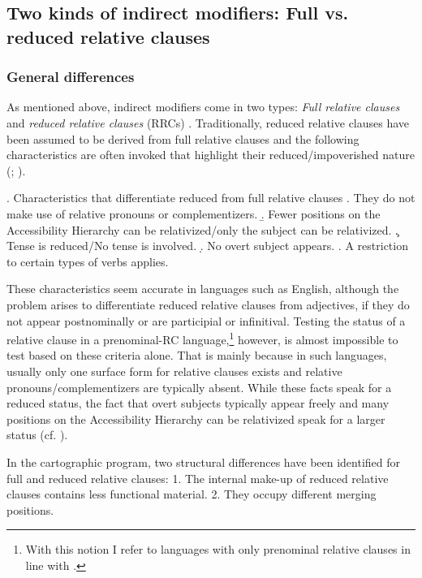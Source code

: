 \documentclass [output=book,colorlinks,citecolor=brown]{langscibook}
\begin{document}
\subsection{Two kinds of indirect modifiers: Full vs. reduced relative clauses} \label{chapter RC}

\subsubsection{General differences}

As mentioned above, indirect modifiers come in two types: \textit{Full relative clauses} and \textit{reduced relative clauses} (RRCs) \citep{cinque:2010:adj, cinque:2020:relcl, krause:2001:rrc, douglas:2016:syntactic, harwood:2018:rrc}. Traditionally, reduced relative clauses have been assumed to be derived from full relative clauses \citep{smith:1964:det} and the following characteristics are often invoked that highlight their reduced/impoverished nature (\citealt[203]{cinque:2020:relcl}; \citealt{bhatt:1999:covert, krause:2001:rrc, douglas:2016:syntactic, harwood:2018:rrc}). %

\ex. Characteristics that differentiate reduced from full relative clauses \label{chara rrc}
\a. They do not make use of relative pronouns or complementizers.
\b. Fewer positions on the Accessibility Hierarchy \citep{keenan:1977:noun} can be relativized/only the subject can be relativized.
\c. Tense is reduced/No tense is involved.
\d. No overt subject appears.
\e. A restriction to certain types of verbs applies.

These characteristics seem accurate in languages such as English, although the problem arises to differentiate reduced relative clauses from adjectives, if they do not appear postnominally or are participial or infinitival. Testing the status of a relative clause in a prenominal-RC language,\footnote{With this notion I refer to languages with only prenominal relative clauses in line with \citet{wu:2011:syntax}.} however, is almost impossible to test based on these criteria alone. That is mainly because in such languages, usually only one surface form for relative clauses exists and relative pronouns/complementizers are typically absent. While these facts speak for a reduced status, the fact that overt subjects typically appear freely and many positions on the Accessibility Hierarchy can be relativized speak for a larger status (cf. \citealt{wu:2011:syntax}). %

In the cartographic program, two structural differences have been identified for full and reduced relative clauses: 1. The internal make-up of reduced relative clauses contains less functional material. 2. They occupy different merging positions.
\end{document}
